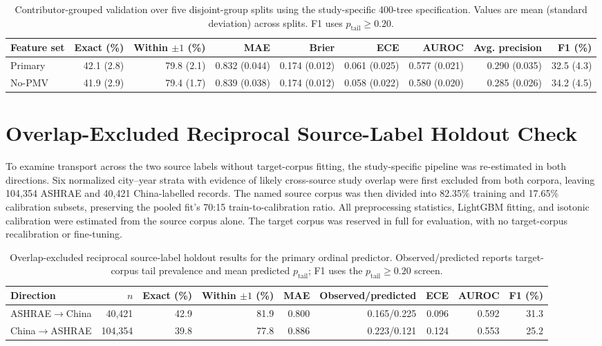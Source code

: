 \documentclass[11pt]{article}
\begin{document}
\begin{table}[htbp]
\centering
\caption{Contributor-grouped validation over five disjoint-group splits using the study-specific 400-tree specification. Values are mean (standard deviation) across splits. F1 uses \(p_{\mathrm{tail}}\ge0.20\).}
\label{tab:supp_grouped_validation}
\scriptsize
\setlength{\tabcolsep}{2.7pt}
\begin{tabular}{lrrrrrrrr}
\toprule
Feature set & Exact (\%) & Within $\pm1$ (\%) & MAE & Brier & ECE & AUROC & Avg. precision & F1 (\%) \\
\midrule
Primary & 42.1 (2.8) & 79.8 (2.1) & 0.832 (0.044) & 0.174 (0.012) & 0.061 (0.025) & 0.577 (0.021) & 0.290 (0.035) & 32.5 (4.3) \\
No-PMV & 41.9 (2.9) & 79.4 (1.7) & 0.839 (0.038) & 0.174 (0.012) & 0.058 (0.022) & 0.580 (0.020) & 0.285 (0.026) & 34.2 (4.5) \\
\bottomrule
\end{tabular}
\end{table}

\section{Overlap-Excluded Reciprocal Source-Label Holdout Check}

To examine transport across the two source labels without target-corpus fitting, the study-specific pipeline was re-estimated in both directions. Six normalized city--year strata with evidence of likely cross-source study overlap were first excluded from both corpora, leaving 104{,}354 ASHRAE and 40{,}421 China-labelled records. The named source corpus was then divided into 82.35\% training and 17.65\% calibration subsets, preserving the pooled fit's 70:15 train-to-calibration ratio. All preprocessing statistics, LightGBM fitting, and isotonic calibration were estimated from the source corpus alone. The target corpus was reserved in full for evaluation, with no target-corpus recalibration or fine-tuning.

\begin{table}[H]
\centering
\caption{Overlap-excluded reciprocal source-label holdout results for the primary ordinal predictor. Observed/predicted reports target-corpus tail prevalence and mean predicted $p_{\mathrm{tail}}$; F1 uses the $p_{\mathrm{tail}}\ge0.20$ screen.}
\label{tab:supp_source_holdout}
\scriptsize
\setlength{\tabcolsep}{2.5pt}
\begin{tabular}{lrrrrrrrr}
\toprule
Direction & $n$ & Exact (\%) & Within $\pm1$ (\%) & MAE & Observed/predicted & ECE & AUROC & F1 (\%) \\
\midrule
ASHRAE$\rightarrow$China & 40{,}421 & 42.9 & 81.9 & 0.800 & 0.165/0.225 & 0.096 & 0.592 & 31.3 \\
China$\rightarrow$ASHRAE & 104{,}354 & 39.8 & 77.8 & 0.886 & 0.223/0.121 & 0.124 & 0.553 & 25.2 \\
\bottomrule
\end{tabular}
\end{table}
\end{document}
